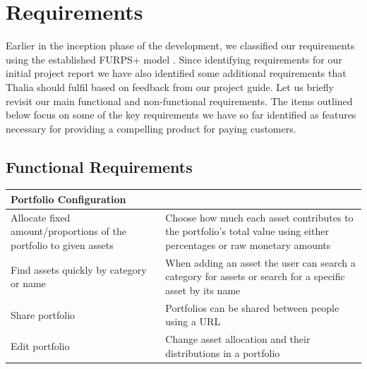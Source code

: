 \documentclass[main.tex]{subfiles}
\begin{document}
\section{Requirements}
Earlier in the inception phase of the development, we classified our requirements using the established FURPS+ model \cite{FURPS}. Since identifying requirements for our initial project report \cite{TR} we have also identified some additional requirements that Thalia should fulfil based on feedback from our project guide. Let us briefly revisit our main functional and non-functional requirements. The items outlined below focus on some of the key requirements we have so far identified as features necessary for providing a compelling product for paying customers.

\subsection{Functional Requirements}
 
{
\setlength{\tabcolsep}{30pt}
\renewcommand{\arraystretch}{2}
\centering
{}
\begin{tabularx}{\linewidth}{|X|X|}
\hline
 \textbf{Portfolio Configuration}  &  \\
 \hline
 Allocate fixed amount/proportions of the portfolio to given assets & Choose how much each asset contributes to the portfolio's total value using either percentages or raw monetary amounts \\
\hline
Find assets quickly by category or name & When adding an asset the user can search a category for assets or search for a specific asset by its name \\
\hline
Share portfolio & Portfolios can be shared between people using a URL \\
\hline
Edit portfolio & Change asset allocation and their distributions in a portfolio \\
\hline
\end{tabularx}
}
\end{document}
